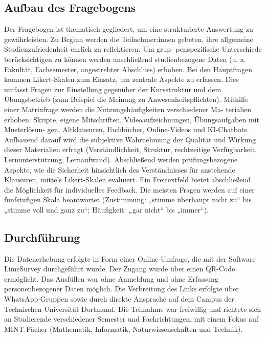 \documentclass[a4paper, 12pt]{article}
\begin{document}
\subsection{Aufbau des Fragebogens}
Der Fragebogen ist thematisch gegliedert, um eine strukturierte Auswertung zu gewährleisten. Zu Beginn werden die Teilnehmer:innen gebeten, ihre allgemeine Studienzufriedenheit ehrlich zu reflektieren. Um grup- penspezifische Unterschiede berücksichtigen zu können werden anschließend studienbezogene Daten (u. a. Fakultät, Fachsemester, angestrebter Abschluss) erhoben. Bei den Hauptfragen kommen Likert-Skalen zum Einsatz, um zentrale Aspekte zu erfassen. Dies umfasst Fragen zur Einstellung gegenüber der Kursstruktur und dem Übungsbetrieb (zum Beispiel die Meinung zu Anwesenheitspflichten). Mithilfe einer Matrixfrage werden die Nutzungshäufigkeiten verschiedener Ma- terialien erhoben: Skripte, eigene Mitschriften, Videoaufzeichnungen, Übungsaufgaben mit Musterlösun- gen, Altklausuren, Fachbücher, Online-Videos und KI-Chatbots. Aufbauend darauf wird die subjektive Wahrnehmung der Qualität und Wirkung dieser Materialien erfragt (Verständlichkeit, Struktur, rechtzeitige Verfügbarkeit, Lernunterstützung, Lernaufwand). Abschließend werden prüfungsbezogene Aspekte, wie die Sicherheit hinsichtlich des Verständnisses für anstehende Klausuren, mittels Likert-Skalen evaluiert. Ein Freitextfeld bietet abschließend die Möglichkeit für individuelles Feedback. Die meisten Fragen werden auf einer fünfstufigen Skala beantwortet (Zustimmung: „stimme überhaupt nicht zu“ bis „stimme voll und ganz zu“; Häufigkeit: „gar nicht“ bis „immer“).

\subsection{Durchführung}
Die Datenerhebung erfolgte in Form einer Online-Umfrage, die mit der Software LimeSurvey durchgeführt wurde. Der Zugang wurde über einen QR-Code ermöglicht. Das Ausfüllen war ohne Anmeldung und ohne Erfassung personenbezogener Daten möglich. Die Verbreitung des Links erfolgte über WhatsApp-Gruppen sowie durch direkte Ansprache auf dem Campus der Technischen Universität Dortmund. Die Teilnahme war freiwillig und richtete sich an Studierende verschiedener Semester und Fachrichtungen, mit einem Fokus auf MINT-Fächer (Mathematik, Informatik, Naturwissenschaften und Technik).
\end{document}
